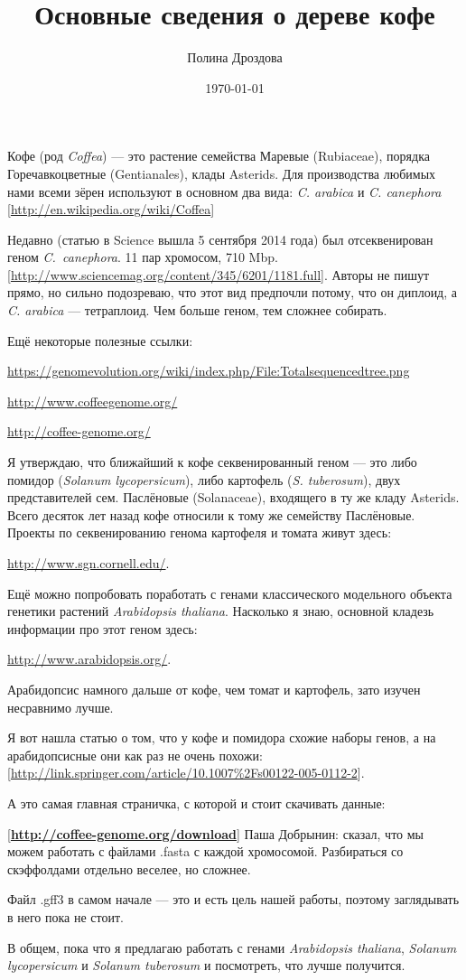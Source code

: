 \documentclass[a4paper,12pt]{article}
\author{Полина Дроздова}
\title{Основные сведения о дереве кофе}
\date{\today}
\begin{document}

\maketitle

Кофе (род \textit{Coffea}) — это растение семейства Маревые (Rubiaceae), порядка Горечавкоцветные (Gentianales), клады Asterids. Для производства любимых нами всеми зёрен используют в основном два вида: \textit{C. arabica} и \textit{C. canephora} [\url{http://en.wikipedia.org/wiki/Coffea}]

Недавно (статью в Science вышла 5 сентября 2014 года) был отсеквенирован геном \textit{C.~canephora}. 11 пар хромосом, 710 Mbp. [\url{http://www.sciencemag.org/content/345/6201/1181.full}]. 
Авторы не пишут прямо, но сильно подозреваю, что этот вид предпочли потому, что он диплоид, а \textit{C. arabica} — тетраплоид. Чем больше геном, тем сложнее собирать.


Ещё некоторые полезные ссылки:

\url{https://genomevolution.org/wiki/index.php/File:Totalsequencedtree.png}

\url{http://www.coffeegenome.org/}

\url{http://coffee-genome.org/}

Я утверждаю, что ближайший к кофе секвенированный геном — это либо помидор (\textit{Solanum lycopersicum}), либо картофель (\textit{S. tuberosum}), двух представителей сем. Паслёновые (Solanaceae), входящего в ту же кладу Asterids. Всего десяток лет назад кофе относили к тому же семейству Паслёновые. Проекты по секвенированию генома картофеля и томата живут здесь:

\url{http://www.sgn.cornell.edu/}.

Ещё можно попробовать поработать с генами классического модельного объекта генетики растений \textit{Arabidopsis thaliana}. Насколько я знаю, основной кладезь информации про этот геном здесь:

\url{http://www.arabidopsis.org/}.

Арабидопсис намного дальше от кофе, чем томат и картофель, зато изучен несравнимо лучше.

Я вот нашла статью о том, что у кофе и помидора схожие наборы генов, а на арабидопсисные они как раз не очень похожи:
[\url{http://link.springer.com/article/10.1007\%2Fs00122-005-0112-2}].


А это самая главная страничка, с которой и стоит скачивать данные:

[\textbf{\url{http://coffee-genome.org/download}}]
Паша Добрынин: сказал, что мы можем работать с файлами .fasta с каждой хромосомой. Разбираться со скэффолдами отдельно веселее, но сложнее.

Файл .gff3 в самом начале — это и есть цель нашей работы, поэтому заглядывать в него пока не стоит.

В общем, пока что я предлагаю работать с генами \textit{Arabidopsis thaliana}, \textit{Solanum lycopersicum} и \textit{Solanum tuberosum} и посмотреть, что лучше получится.
\end{document}
